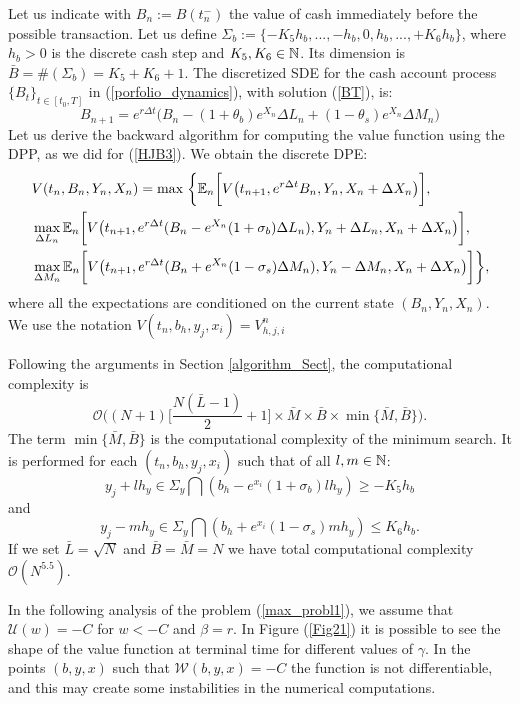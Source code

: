 Let us indicate with $B_n := B(t^-_n)$ the value of cash immediately before the possible transaction.
Let us define $\Sigma_b := \{-K_5 h_b , ... , -h_b,0,h_b, ... , +K_6 h_b \}$,  
where $h_b>0$ is the discrete cash step and  $K_5,K_6 \in \mathbb{N}$. Its dimension is $\bar B = \#(\Sigma_b) = K_5+K_6+1$.
The discretized SDE for the cash account process $\{B_t\}_{t \in [t_0,T]}$ in (\ref{porfolio_dynamics}), with solution (\ref{BT}), is:
\begin{equation}\label{Bn}
 B_{n+1} =  e^{r \Delta t} \biggl( B_n - (1+\theta_b) e^{X_n} \Delta L_n + (1-\theta_s) e^{X_n} \Delta M_n \biggr)
\end{equation}
Let us derive the backward algorithm for computing the value function using the DPP, as we did for (\ref{HJB3}). %
We obtain the discrete DPE: 
\begin{align}\label{HJB5}
 & V(t_n,B_n,Y_n,X_n) = \max \; \biggl\{ \mathbb{E}_n 
 \biggl[ V \bigl( t_{n+1}, e^{r \Delta t} B_n, Y_n, X_n + \Delta X_n \bigr) \biggr], \\ \nonumber
 & \max_{\Delta L_n} 
 \mathbb{E}_n \biggl[ V \bigl( t_{n+1}, e^{r\Delta t}(B_n - e^{X_n}(1+\sigma_b)\Delta L_n) , Y_n + \Delta L_n, X_n + \Delta X_n \bigr) \biggr] , \\ \nonumber
 & \max_{\Delta M_n}
 \mathbb{E}_n \biggl[ V \bigl( t_{n+1}, e^{r\Delta t}(B_n + e^{X_n}(1-\sigma_s)\Delta M_n) , Y_n - \Delta M_n, X_n + \Delta X_n \bigr) \biggr]
 \biggr\},
\end{align}
where all the expectations are conditioned on the current state $(B_n,Y_n,X_n)$.  We use the notation $V(t_n, b_h, y_j, x_i) = V^n_{h,j,i}$

Following the arguments in Section \ref{algorithm_Sect}, the computational complexity is 
$$\mathcal{O}\biggl( (N+1)\bigl[\frac{N(\bar L-1)}{2}+1 \bigr] \times \bar M \times \bar B \times \min\{\bar M, \bar B\} \biggr).$$
The term $\min\{\bar M, \bar B\}$ is the computational complexity of the minimum search. 
It is performed for each $(t_n, b_h,y_j,x_i)$ such that of all $l,m \in \mathbb{N}$:
$$ y_j+l h_y \in \Sigma_y \bigcap (b_h - e^{x_i}(1+\sigma_b)l h_y) \geq -K_5 h_b $$ 
and 
$$y_j-m h_y \in \Sigma_y \bigcap (b_h + e^{x_i}(1-\sigma_s)m h_y) \leq K_6 h_b .$$ 
If we set $\bar L = \sqrt{N}$ and $\bar B = \bar M = N$ we have total computational complexity $\mathcal{O}(N^{5.5})$. 

In the following analysis of the problem (\ref{max_probl1}), we assume that $\mathcal{U}(w) = -C$ for $w < -C$ and $\beta = r$. 
In Figure (\ref{Fig21}) it is possible to see the shape of the value function at terminal time for different values of $\gamma$.
In the points $(b,y,x)$ such that $\mathcal{W}(b,y,x) = -C$ the function is not differentiable, and this may create some instabilities in the numerical computations. 

